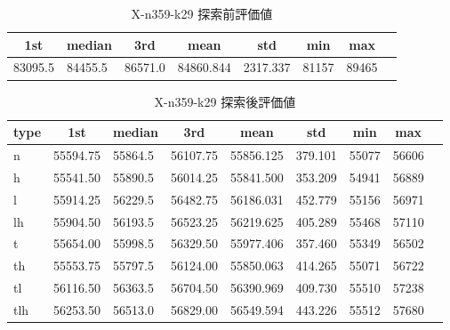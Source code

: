 \begin{table}[htbp]
    \centering
    \caption{X-n359-k29 探索前評価値}
    \begin{tabular}{|l|l|l|l|l|l|l|l|}\hline
    \multicolumn{1}{|c|}{\textbf{1st}}
    &\multicolumn{1}{c|}{\textbf{median}}
    &\multicolumn{1}{c|}{\textbf{3rd}}
    &\multicolumn{1}{c|}{\textbf{mean}}
    &\multicolumn{1}{c|}{\textbf{std}}
    &\multicolumn{1}{c|}{\textbf{min}}
    &\multicolumn{1}{c|}{\textbf{max}}\\\hline
	83095.5 & 84455.5 & 86571.0 & 84860.844 & 2317.337 & 81157 & 89465\\\hline
	\end{tabular}
\end{table}
\begin{table}[htbp]
    \centering
    \caption{X-n359-k29 探索後評価値}
    \begin{tabular}{|l|l|l|l|l|l|l|l|l|}\hline
    \multicolumn{1}{|c|}{\textbf{type}}
    &\multicolumn{1}{|c|}{\textbf{1st}}
    &\multicolumn{1}{c|}{\textbf{median}}
    &\multicolumn{1}{c|}{\textbf{3rd}}
    &\multicolumn{1}{c|}{\textbf{mean}}
    &\multicolumn{1}{c|}{\textbf{std}}
    &\multicolumn{1}{c|}{\textbf{min}}
    &\multicolumn{1}{c|}{\textbf{max}}\\\hline
	n & 55594.75 & 55864.5 & 56107.75 & 55856.125 & 379.101 & 55077 & 56606\\\hline
	h & 55541.50 & 55890.5 & 56014.25 & 55841.500 & 353.209 & 54941 & 56889\\\hline
	l & 55914.25 & 56229.5 & 56482.75 & 56186.031 & 452.779 & 55156 & 56971\\\hline
	lh & 55904.50 & 56193.5 & 56523.25 & 56219.625 & 405.289 & 55468 & 57110\\\hline
	t & 55654.00 & 55998.5 & 56329.50 & 55977.406 & 357.460 & 55349 & 56502\\\hline
	th & 55553.75 & 55797.5 & 56124.00 & 55850.063 & 414.265 & 55071 & 56722\\\hline
	tl & 56116.50 & 56363.5 & 56704.50 & 56390.969 & 409.730 & 55510 & 57238\\\hline
	tlh & 56253.50 & 56513.0 & 56829.00 & 56549.594 & 443.226 & 55512 & 57680\\\hline
	\end{tabular}
\end{table}
